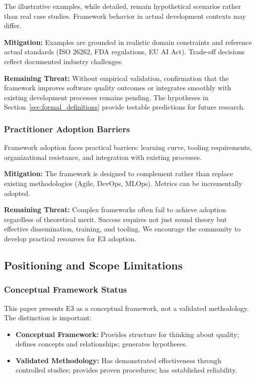 The illustrative examples, while detailed, remain hypothetical scenarios rather than real case studies. Framework behavior in actual development contexts may differ.

\textbf{Mitigation:} Examples are grounded in realistic domain constraints and reference actual standards (ISO 26262, FDA regulations, EU AI Act). Trade-off decisions reflect documented industry challenges.

\textbf{Remaining Threat:} Without empirical validation, confirmation that the framework improves software quality outcomes or integrates smoothly with existing development processes remains pending. The hypotheses in Section~\ref{sec:formal_definitions} provide testable predictions for future research.

\subsubsection{Practitioner Adoption Barriers}

Framework adoption faces practical barriers: learning curve, tooling requirements, organizational resistance, and integration with existing processes.

\textbf{Mitigation:} The framework is designed to complement rather than replace existing methodologies (Agile, DevOps, MLOps). Metrics can be incrementally adopted.

\textbf{Remaining Threat:} Complex frameworks often fail to achieve adoption regardless of theoretical merit. Success requires not just sound theory but effective dissemination, training, and tooling. We encourage the community to develop practical resources for E3 adoption.

\subsection{Positioning and Scope Limitations}

\subsubsection{Conceptual Framework Status}

This paper presents E3 as a conceptual framework, not a validated methodology. The distinction is important:

\begin{itemize}[leftmargin=2em]
    \item \textbf{Conceptual Framework:} Provides structure for thinking about quality; defines concepts and relationships; generates hypotheses.
    \item \textbf{Validated Methodology:} Has demonstrated effectiveness through controlled studies; provides proven procedures; has established reliability.
\end{itemize}

